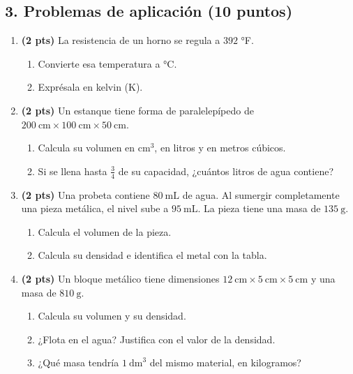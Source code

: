 \documentclass[12pt, letterpaper]{article}
\begin{document}
\newpage
\subsection*{3. Problemas de aplicación (10 puntos)}

\begin{enumerate}[leftmargin=*, label=\textbf{\arabic*.}, itemsep=1.0em]

  \item \textbf{(2 pts)} La resistencia de un horno se regula a $392$ °F.
        \begin{enumerate}[label=\alph*), leftmargin=1.8em, itemsep=0.3em]
          \item Convierte esa temperatura a °C.
          \item Exprésala en kelvin (K).
        \end{enumerate}
        \vspace{1.6cm}

  \item \textbf{(2 pts)} Un estanque tiene forma de paralelepípedo de
        $200\ \text{cm}\times100\ \text{cm}\times50\ \text{cm}$.
        \begin{enumerate}[label=\alph*), leftmargin=1.8em, itemsep=0.3em]
          \item Calcula su volumen en $\text{cm}^3$, en litros y en metros cúbicos.
          \item Si se llena hasta $\frac{3}{4}$ de su capacidad, ¿cuántos litros de agua contiene?
        \end{enumerate}
        \vspace{1.8cm}

  \item \textbf{(2 pts)} Una probeta contiene $80\ \text{mL}$ de agua. Al sumergir
        completamente una pieza metálica, el nivel sube a $95\ \text{mL}$.
        La pieza tiene una masa de $135\ \text{g}$.
        \begin{enumerate}[label=\alph*), leftmargin=1.8em, itemsep=0.3em]
          \item Calcula el volumen de la pieza.
          \item Calcula su densidad e identifica el metal con la tabla.
        \end{enumerate}
        \vspace{1.8cm}

  \item \textbf{(2 pts)} Un bloque metálico tiene dimensiones
        $12\ \text{cm}\times5\ \text{cm}\times5\ \text{cm}$ y una masa de $810\ \text{g}$.
        \begin{enumerate}[label=\alph*), leftmargin=1.8em, itemsep=0.3em]
          \item Calcula su volumen y su densidad.
          \item ¿Flota en el agua? Justifica con el valor de la densidad.
          \item ¿Qué masa tendría $1\ \text{dm}^3$ del mismo material, en kilogramos?
        \end{enumerate}
        \vspace{1.8cm}


\end{enumerate}
\end{document}
